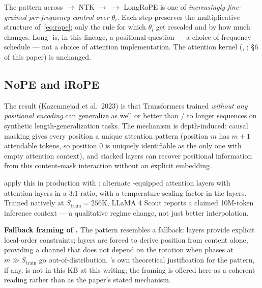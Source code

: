 The pattern across  $\to$ NTK $\to$  $\to$ LongRoPE is one of
\emph{increasingly fine-grained per-frequency control over $\theta_i$}.
Each step preserves the multiplicative structure
of~\eqref{eq:rope}; only the rule for which $\theta_i$ get rescaled
and by how much changes. Long- is, in this lineage, a
positional question --- a choice of frequency schedule --- not a
choice of attention implementation. The attention kernel
(, ; \S 6 of this paper) is unchanged.

\subsection{NoPE and iRoPE}
\label{sec:pos-nope}

 The  result (Kazemnejad et al.\
2023) is that  Transformers trained \emph{without any
positional encoding} can generalize as well or better than \glsterm{rope}{RoPE}/
to longer sequences on synthetic length-generalization tasks. The
mechanism is depth-induced: causal masking gives every position a
unique attention pattern (position $m$ has $m+1$ attendable tokens, so
position 0 is uniquely identifiable as the only one with empty
attention context), and stacked layers can recover positional
information from this content-mask interaction without an explicit
embedding.

\citet{meta-llama4} apply this in production with : alternate
\glsterm{rope}{RoPE}-equipped attention layers with  attention layers in a 3:1
ratio, with a temperature-scaling factor in the \glsterm{nope}{NoPE} layers. Trained
natively at $S_{\text{train}} = 256\text{K}$, LLaMA 4 Scout reports a
claimed 10M-token inference context --- a qualitative regime change,
not just better interpolation.

\begin{speculation}
\textbf{Fallback framing of .} The pattern resembles a fallback:
\glsterm{rope}{RoPE} layers provide explicit local-order constraints;  layers are
forced to derive position from content alone, providing a channel that
does not depend on the rotation when phases at $m \gg S_{\text{train}}$
go out-of-distribution. \citet{meta-llama4}'s own theoretical
justification for the pattern, if any, is not in this KB at this
writing; the framing is offered here as a coherent reading rather than
as the paper's stated mechanism.
\end{speculation}

